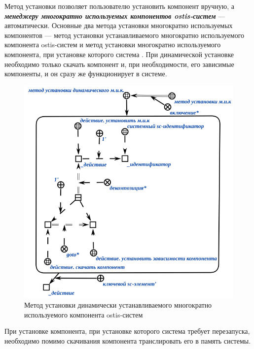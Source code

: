 Метод установки позволяет пользователю установить компонент вручную, а \textbf{\textit{менеджеру многократно используемых компонентов ostis-систем}} --- автоматически. Основные два метода установки многократно используемых компонентов --- метод установки  устанавливаемого многократно используемого компонента ostis-систем и метод установки многократно используемого компонента, при установке которого система . При динамической установке необходимо только скачать компонент и, при необходимости, его зависимые компоненты, и он сразу же функционирует в системе. 

\begin{figure}[H]
	\includegraphics[scale=0.6]{author/part5/figures/install_dynamic_method.png}
	\caption{Метод установки динамически устанавливаемого многократно используемого компонента ostis-систем}
	\label{fig:dynamic_method}
\end{figure}

При установке компонента, при установке которого система требует перезапуска, необходимо помимо скачивания компонента транслировать его в память системы.

